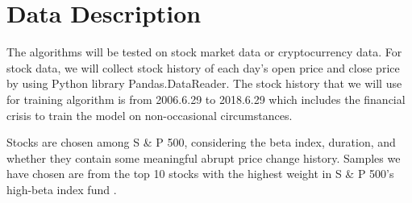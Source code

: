 \chapter{Data Description}
\label{Ch:figures}

The algorithms will be tested on stock market data or cryptocurrency data. For stock data, we will collect stock history of each day’s open price and close price by using Python library Pandas.DataReader. The stock history that we will use for training algorithm is from  2006.6.29 to 2018.6.29 which includes the financial crisis to train the model on non-occasional circumstances. 

Stocks are chosen among S \& P 500, considering the beta index, duration, and whether they contain some meaningful abrupt price change history. Samples we have chosen are from the top 10 stocks with the highest weight in S \& P 500’s high-beta index fund . 
